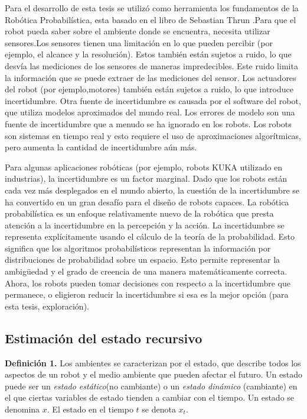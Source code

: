 Para el desarrollo de esta tesis se utilizó como herramienta los fundamentos de la  Robótica Probabilística, esta basado en el libro de Sebastian Thrun \cite{Thrun2005}.Para que el robot pueda saber sobre el ambiente donde se encuentra, necesita utilizar sensores.Los sensores tienen una limitación en lo que pueden percibir (por ejemplo, el alcance y la resolución). Estos también están sujetos a ruido, lo que desvía las mediciones de los sensores de maneras impredecibles. Este ruido limita la información que se puede extraer de las mediciones del sensor. Los actuadores del robot (por ejemplo,motores) también están sujetos a ruido, lo que introduce incertidumbre. Otra fuente de incertidumbre es causada por el software del robot, que utiliza modelos aproximados del mundo real. Los errores de modelo son una fuente de incertidumbre que a menudo se ha ignorado en los robots. Los robots son sistemas en tiempo real y esto requiere el uso de aproximaciones algorítmicas, pero aumenta la cantidad de incertidumbre aún más.

Para algunas aplicaciones robóticas (por ejemplo, robots KUKA utilizado en industrias), la incertidumbre es un factor marginal. Dado que los robots están cada vez más desplegados en el mundo abierto, la cuestión de la incertidumbre se ha convertido en un gran desafío para el diseño de robots capaces. La robótica probabilística es un enfoque relativamente nuevo de la robótica que presta atención a la incertidumbre en la percepción y la acción. La incertidumbre se representa explícitamente usando el cálculo de la teoría de la probabilidad. Esto significa que los algoritmos probabilísticos representan la información por distribuciones de probabilidad sobre un espacio. Esto permite representar la ambigüedad y el grado de creencia de una manera matemáticamente correcta. Ahora, los robots pueden tomar decisiones con respecto a la incertidumbre que permanece, o eligieron reducir la incertidumbre si esa es la mejor opción (para esta tesis, exploración).


\subsection{Estimación del estado recursivo}

\textbf{Definición 1.} Los ambientes se caracterizan por el estado, que describe todos los aspectos de un robot y el medio ambiente que pueden afectar el futuro. Un estado puede ser un \textit{estado estático}(no cambiante) o un \textit{estado dinámico} (cambiante) en el que ciertas variables de estado tienden a cambiar con el tiempo. Un estado se denomina $x$. El estado en el tiempo $t$ se denota $x_{t}$.

